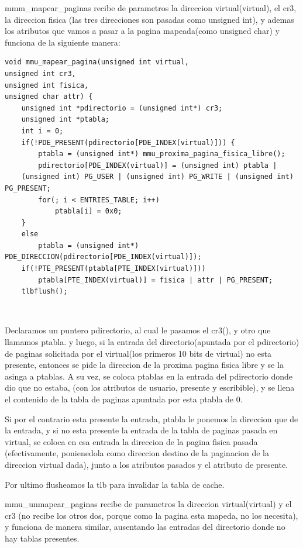 \documentclass[a4paper]{article}
\newenvironment{codesnippet}{%
	\begin{Sbox}\begin{minipage}{\textwidth}\sffamily\small}%
	{\end{minipage}\end{Sbox}%
		\begin{center}%
		\vspace{-0.4cm}\colorbox{litegrey}{\TheSbox}\end{center}\vspace{0.3cm}}
\begin{document}
mmm_mapear_paginas recibe de parametros  la direccion virtual(virtual), el cr3, la direccion fisica (las tres direcciones son pasadas como unsigned int), y ademas los atributos que vamos a pasar a la pagina mapeada(como unsigned char) y funciona de la siguiente manera:



\begin{codesnippet}
\begin{verbatim}	
void mmu_mapear_pagina(unsigned int virtual,
unsigned int cr3,
unsigned int fisica, 
unsigned char attr) {
	unsigned int *pdirectorio = (unsigned int*) cr3;
	unsigned int *ptabla;
	int i = 0;
	if(!PDE_PRESENT(pdirectorio[PDE_INDEX(virtual)])) {
		ptabla = (unsigned int*) mmu_proxima_pagina_fisica_libre();
		pdirectorio[PDE_INDEX(virtual)] = (unsigned int) ptabla | 
	(unsigned int) PG_USER | (unsigned int) PG_WRITE | (unsigned int) PG_PRESENT;
		for(; i < ENTRIES_TABLE; i++)
			ptabla[i] = 0x0;
	} 
	else 
		ptabla = (unsigned int*) PDE_DIRECCION(pdirectorio[PDE_INDEX(virtual)]);
	if(!PTE_PRESENT(ptabla[PTE_INDEX(virtual)]))
		ptabla[PTE_INDEX(virtual)] = fisica | attr | PG_PRESENT;
	tlbflush();
\end{verbatim}
\end{codesnippet}

\

Declaramos un puntero pdirectorio, al cual le pasamos el cr3(), y otro que llamamos ptabla. y luego, si la entrada del directorio(apuntada por el pdirectorio) de paginas solicitada por el virtual(los primeros 10 bits de virtual) no esta presente, entonces se pide la direccion de la proxima pagina fisica libre y se la asinga a ptablas. A su vez, se coloca ptablas en la entrada del pdirectorio donde dio que no estaba, (con los atributos de usuario, presente y escribible), y se llena el contenido de la tabla de paginas apuntada por esta ptabla de 0.

Si por el contrario esta presente la entrada, ptabla le ponemos la direccion que de la entrada, y si no esta presente la entrada de la tabla de paginas pasada en virtual, se coloca en esa entrada la direccion de la pagina fisica pasada (efectivamente, ponienedola como direccion destino de la paginacion de la direccion virtual dada), junto a los atributos pasados y el atributo de presente.

Por ultimo flusheamos la tlb para invalidar la tabla de cache.

mmu_unmapear_paginas recibe de parametros  la direccion virtual(virtual) y el cr3 (no recibe los otros dos, porque como la pagina esta mapeda, no los necesita), y funciona de manera similar, ausentando las entradas del directorio  donde no hay tablas presentes.\\
\end{document}
